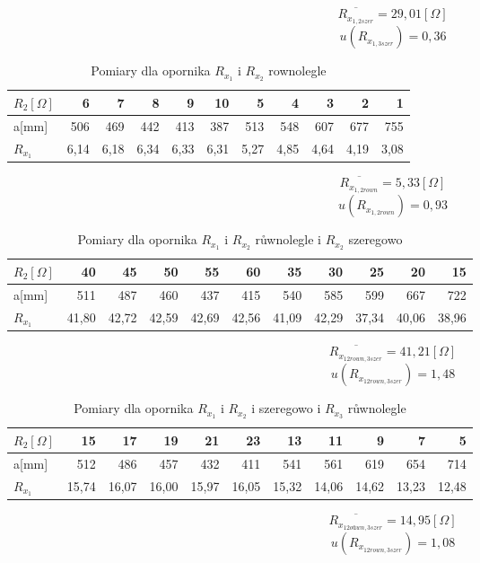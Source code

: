\documentclass[a4paper,10pt,twoside]{article}
\begin{document}
$$\overline{R_{x_{1,2szer}}}=29,01 [\Omega]$$
$$u(R_{x_{1,3szer}})=0,36$$
\begin{table}
	\centering
	\begin{tabular}{|l|r|r|r|r|r|r|r|r|r|r|}
		\hline
		$R_2[\Omega]$  & 6  & 7    & 8     & 9     & 10   & 5    & 4     & 3      & 2      & 1    \\
		\hline
		a[mm]  & 506   & 469  & 442 & 413   & 387  & 513  & 548  & 607   & 677   & 755   \\
		\hline
		$R_{x_1}$ & 6,14  & 6,18  & 6,34  & 6,33  & 6,31  & 5,27  & 4,85  & 4,64  & 4,19  & 3,08 \\
		\hline                      
	\end{tabular}
	\caption{Pomiary dla opornika  $R_{x_1}$ i $R_{x_2}$ rownolegle}
	\label{tab:Rx1}
\end{table}
$$\overline{R_{x_{1,2rown}}}=5,33 [\Omega]$$
$$u(R_{x_{1,2rown}})=0,93$$
	\begin{table}
		\centering
		\begin{tabular}{|l|r|r|r|r|r|r|r|r|r|r|}
			\hline
			$R_2[\Omega]$  & 40 & 45   & 50    & 55    & 60   & 35   & 30    & 25     & 20     & 15   \\
			\hline
			a[mm]  & 511   & 487  & 460& 437   & 415  & 540  & 585  & 599   & 667   & 722   \\
			\hline
			$R_{x_1}$ & 41,80& 42,72 & 42,59 & 42,69 & 42,56 & 41,09 & 42,29 & 37,34 & 40,06 & 38,96\\
			\hline                      
		\end{tabular}
		\caption{Pomiary dla opornika $R_{x_1}$ i $R_{x_2}$ růwnolegle i $R_{x_2}$ szeregowo}
		\label{tab:Rx1}
	\end{table}
$$\overline{R_{x_{12rown,3szer}}}=41,21 [\Omega]$$
$$u(R_{x_{12rown,3szer}})=1,48$$
\begin{table}
	\centering
	\begin{tabular}{|l|r|r|r|r|r|r|r|r|r|r|}
		\hline
		$R_2[\Omega]$  & 15& 17   & 19    & 21    & 23   & 13   & 11    & 9      & 7      & 5    \\
		\hline
		a[mm]  & 512   & 486  & 457 & 432 & 411  & 541  & 561  & 619 & 654   & 714   \\
		\hline
		$R_{x_1}$ & 15,74 & 16,07 & 16,00 & 15,97 & 16,05 & 15,32 & 14,06 & 14,62 & 13,23 & 12,48\\
		\hline                      
	\end{tabular}
	\caption{Pomiary dla opornika $R_{x_1}$ i $R_{x_2}$ i szeregowo i $R_{x_3}$ růwnolegle}
	\label{tab:Rx1}
	$$\overline{R_{x_{12oůwn,3szer}}}=14,95 [\Omega]$$
	$$u(R_{x_{12rown,3szer}})=1,08$$
\end{table}
\end{document}
